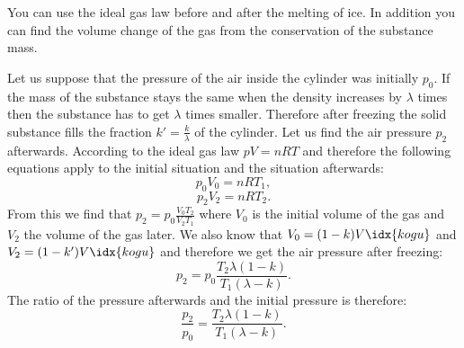 \hinteng
You can use the ideal gas law before and after the melting of ice. In addition you can find the volume change of the gas from the conservation of the substance mass.

\solueng
Let us suppose that the pressure of the air inside the cylinder was initially $p_{0}$. If the mass of the substance stays the same when the density increases by $\lambda$ times then the substance has to get $\lambda$ times smaller. Therefore after freezing the solid substance fills the fraction $k'=\frac{k}{\lambda}$ of the cylinder. Let us find the air pressure $p_{2}$ afterwards. According to the ideal gas law $pV=nRT$ and therefore the following equations apply to the initial situation and the situation afterwards:
\begin{equation*}
p_{0}V_{0}=nRT_{1},
\end{equation*} 
\begin{equation*}
p_{2}V_{2}=nRT_{2}.
\end{equation*}
From this we find that $p_{2}=p_{0}\frac{V_{0}T_{2}}{V_{2}T_{1}}$ where $V_{0}$ is the initial volume of the gas and $V_{2}$ the volume of the gas later. We also know that $V_{0}=(1-k)V\idx{kogu}$ and $V_{2}=(1-k')V\idx{kogu}$ and therefore we get the air pressure after freezing:
\begin{equation*}
p_{2}=p_{0}\frac{T_{2}\lambda (1-k)}{T_{1}(\lambda-k)}.
\end{equation*} 
The ratio of the pressure afterwards and the initial pressure is therefore:
\begin{equation*}
\frac{p_{2}}{p_{0}}=\frac{T_{2}\lambda(1-k)}{T_{1}(\lambda-k)}.
\end{equation*}
\probend
